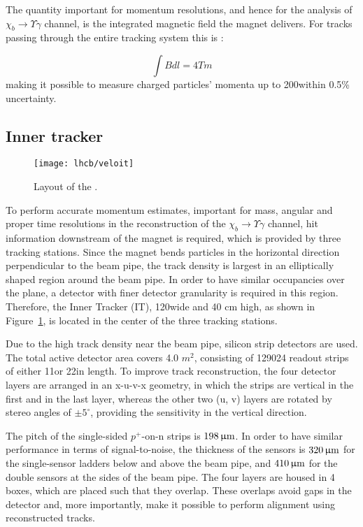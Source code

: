 The quantity important for momentum resolutions, and hence for the analysis of
$\chi_b \rightarrow \Upsilon \gamma$ channel, is the integrated magnetic field
the magnet delivers. For tracks passing through the entire tracking system this
is
\cite{Alves:2008zz}:   

$$ \int Bdl = 4 Tm $$ making it possible to measure charged particles’ momenta
up to 200\gev within 0.5\% uncertainty.

\subsection{Inner tracker}

\begin{figure}[tb]
\begin{center}
\texttt{[image: lhcb/veloit]}
\end{center}
\caption{\small Layout of the \intr.}
\label{fig:veloit}
\end{figure}

To perform accurate momentum estimates, important for mass, angular and proper
time resolutions in the reconstruction of the $\chi_b \rightarrow \Upsilon
\gamma$ channel, hit information downstream of the magnet is required, which is
provided by three tracking stations. Since the magnet bends particles in the
horizontal direction perpendicular to the beam pipe, the track density is
largest in an elliptically shaped region around the beam pipe. In order to have
similar occupancies over the plane, a detector with finer detector granularity
is required in this region. Therefore, the Inner Tracker (IT), 120\cm wide and
40 cm high, as shown in Figure~\ref{fig:veloit}, is located in the center of
the three tracking stations.



Due to the high track density near the beam pipe, silicon strip detectors are
used. The total active detector area covers 4.0 $m^2$, consisting of 129024
readout strips of either 11\cm or 22\cm in length. To improve track
reconstruction, the four detector layers are arranged in an x-u-v-x geometry,
in which the strips are vertical in the first and in the last layer, whereas
the other two (u, v) layers are rotated by stereo angles of $\pm5^\circ$,
providing the sensitivity in the vertical direction.

The pitch of the single-sided $p^+$-on-n strips is $198{\,\upmu\rm m}$. In order to have
similar performance in terms of signal-to-noise, the thickness of the sensors
is $320{\,\upmu\rm m}$ for the single-sensor ladders below and above the beam pipe, and
$410{\,\upmu\rm m}$ for the double sensors at the sides of the beam pipe. The four
layers are housed in 4 boxes, which are placed such that they overlap. These
overlaps avoid gaps in the detector and, more importantly, make it possible to
perform alignment using reconstructed tracks.



